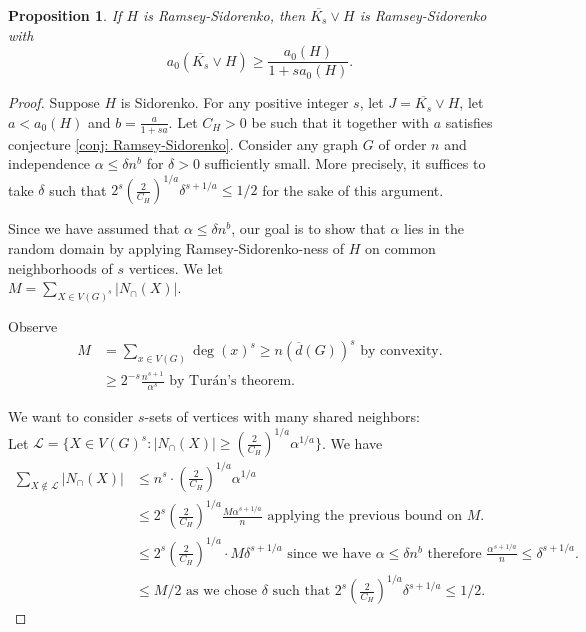 \documentclass[12pt]{article}
\newtheorem{proposition}[theorem]{Proposition}
\begin{document}
\begin{proposition}
\label{prop: cones independence-forcing}
    If $H$ is Ramsey-Sidorenko, then $\overline{K_s}\vee H$ is Ramsey-Sidorenko with 
    \[
    a_0(\overline{K_s}\vee H)\geq\frac{a_0(H)}{1+sa_0(H)}.
    \]
\end{proposition}
\begin{proof}
Suppose $H$ is Sidorenko. For any positive integer $s$, let $J=\overline{K_s}\vee H$, let $a<a_0(H)$ and $b=\frac{a}{1+sa}$. Let $C_H>0$ be such that it together with $a$ satisfies conjecture \ref{conj: Ramsey-Sidorenko}. Consider any graph $G$ of order $n$ and independence $\alpha\leq\delta n^b$ for $\delta>0$ sufficiently small. More precisely, it suffices to take $\delta$ such that $2^s\left(\frac{2}{C_H}\right)^{1/a} \delta^{s+1/a}\leq 1/2$ for the sake of this argument.

Since we have assumed that $\alpha\leq\delta n^b$, our goal is to show that $\alpha$ lies in the random domain by applying Ramsey-Sidorenko-ness of $H$ on common neighborhoods of $s$ vertices. We let\\ $M=\sum_{X\in V(G)^s}|N_\cap(X)|$.

Observe\begin{align*}
    M&=\sum_{x\in V(G)}\deg(x)^s\geq n(\overline d(G))^s\text{ by convexity.}\\
    &\geq 2^{-s}\frac{n^{s+1}}{\alpha^s}\text{ by Tur\'an's theorem.}
\end{align*}

We want to consider $s$-sets of vertices with many shared neighbors:\\ Let $\mathcal L=\{X\in V(G)^s:|N_\cap(X)|\geq\left(\frac{2}{C_H}\right)^{1/a}\alpha^{1/a}\}$. We have
\begin{align*}
    \sum_{X\not\in\mathcal L}|N_\cap(X)|&\leq n^s\cdot\left(\frac{2}{C_H}\right)^{1/a}\alpha^{1/a}\\
    &\leq 2^s\left(\frac{2}{C_H}\right)^{1/a}\frac{M\alpha^{s+1/a}}{n}\text{ applying the previous bound on $M$.}\\
    &\leq 2^s\left(\frac{2}{C_H}\right)^{1/a}\cdot M\delta^{s+1/a}\text{ since we have $\alpha\leq\delta n^b$ therefore $\frac{\alpha^{s+1/a}}{n}\leq \delta^{s+1/a}$}.\\
    &\leq M/2\text{ as we chose $\delta$ such that $2^s\left(\frac{2}{C_H}\right)^{1/a} \delta^{s+1/a}\leq 1/2$}.
\end{align*}


\end{proof}
\end{document}
